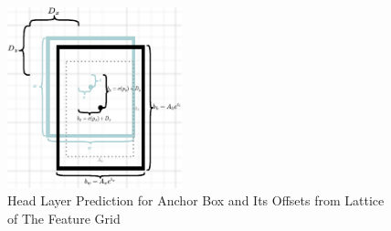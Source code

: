     \begin{figure}[t]
        \centering
        \includegraphics[width=0.45\textwidth]{figures/anchor.pdf}
        \caption{Head Layer Prediction for Anchor Box and Its Offsets from Lattice of The Feature Grid }
        \label{fig:anchorbox}
    \end{figure}

  

